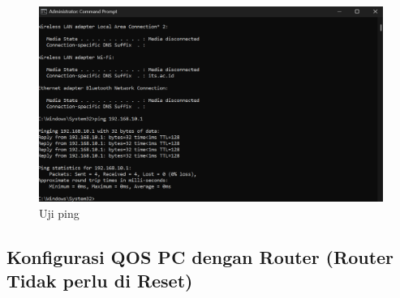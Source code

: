 \begin{enumerate}
\begin{figure}[H]
        \label{fig:gambar4}
    \end{figure}
\begin{figure}[H]
        \centering
        \includegraphics[width=0.5\linewidth]{P1/img/11.png}
        \caption{Uji ping}
        \label{fig:gambar4}
    \end{figure}
\end{enumerate}

\subsection{Konfigurasi QOS PC dengan Router (Router Tidak perlu di Reset)}
